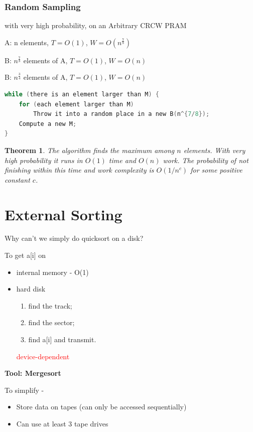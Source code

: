 \documentclass{article}
\newtheorem*{Theorem}{Theorem}
\begin{document}
\subsubsection{Random Sampling}
with very high probability, on an Arbitrary CRCW PRAM

A: n elements, $T = O(1)$, $W = O(n^{\frac{7}{8}})$

B: $n^{\frac{7}{8}}$ elements of A, $T = O(1)$, $W = O(n)$

B: $n^{\frac{3}{4}}$ elements of A, $T = O(1)$, $W = O(n)$

\begin{lstlisting}[language = {c}]
while (there is an element larger than M) {
    for (each element larger than M)
        Throw it into a random place in a new B(n^{7/8});
    Compute a new M;
}
\end{lstlisting}

\begin{Theorem}
    The algorithm finds the maximum among $n$ elements.  With very high probability it runs in $O(1)$ time and $O(n)$ work.  The probability of not finishing within this time and work complexity is $O(1/n^c)$ for some positive constant $c$.
\end{Theorem}

\newpage

\section{External Sorting}

Why can't we simply do quicksort on a disk?

To get a[i] on

\begin{itemize}
    \item internal memory - O(1)
    \item hard disk
    \begin{enumerate}
        \item find the track; 
        \item find the sector; 
        \item find a[i] and transmit.
    \end{enumerate}
    \textcolor{red}{device-dependent}
\end{itemize}

\textbf{Tool: Mergesort }

To simplify -

\begin{itemize}
    \item Store data on tapes (can only be accessed sequentially)
    \item Can use at least 3 tape drives
\end{itemize}
\end{document}
